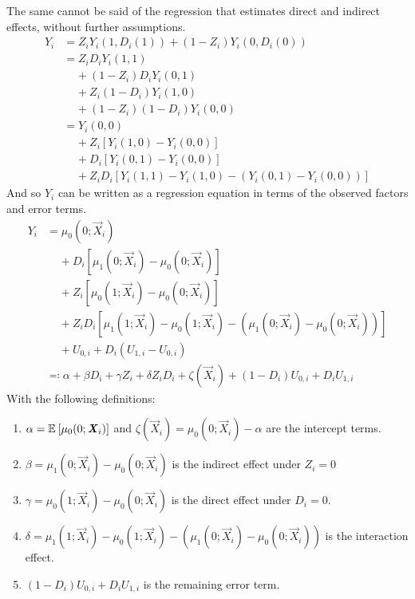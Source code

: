The same cannot be said of the regression that estimates direct and indirect effects, without further assumptions.
\begin{align*}
    Y_i &= Z_i Y_i(1, D_i(1)) + (1 - Z_i) Y_i(0, D_i(0)) \\
        &= Z_i D_i Y_i(1, 1) \\
        & \;\;\;\; + (1 - Z_i) D_i Y_i(0, 1) \\
        & \;\;\;\; + Z_i (1 - D_i) Y_i(1, 0) \\
        & \;\;\;\; + (1 - Z_i) (1 - D_i) Y_i(0, 0) \\
        &= Y_i(0, 0) \\
        & \;\;\;\; + Z_i \left[Y_i(1, 0) - Y_i(0, 0) \right] \\
        & \;\;\;\; + D_i \left[Y_i(0, 1) - Y_i(0, 0) \right] \\
        & \;\;\;\; + Z_i D_i \left[Y_i(1, 1) - Y_i(1, 0)
            - \left( Y_i(0, 1) - Y_i(0, 0) \right)\right]
\end{align*}
And so $Y_i$ can be written as a regression equation in terms of the observed factors and error terms.
\begin{align*}
    Y_i &= \mu_0(0; \vec X_i) \\
        & \;\;\;\; + D_i \left[\mu_1(0; \vec X_i) - \mu_0(0; \vec X_i) \right] \\
        & \;\;\;\; + Z_i \left[\mu_0(1; \vec X_i) - \mu_0(0; \vec X_i) \right] \\
        & \;\;\;\; + Z_i D_i \left[\mu_1(1; \vec X_i) - \mu_0(1; \vec X_i)
            - \left( \mu_1(0; \vec X_i) - \mu_0(0; \vec X_i) \right)\right] \\
        & \;\;\;\; + U_{0,i} + D_i \left( U_{1,i} - U_{0,i} \right) \\
        &\eqqcolon
            \alpha + \beta D_i + \gamma Z_i + \delta Z_i D_i
            + \zeta(\vec X_i)
            + \left( 1 - D_i \right) U_{0,i} + D_i U_{1,i}
\end{align*}
With the following definitions:
\begin{enumerate}[label=\textbf{(\alph*)}]
    \item $\alpha = \mathbb{E}_{} \left[ \mu_0(0; \boldsymbol{\mathit{X}}_i) \right]$ and $\zeta(\vec X_i) = \mu_0(0; \vec X_i) - \alpha$ are the intercept terms.
    \item $\beta = \mu_1(0; \vec X_i) - \mu_0(0; \vec X_i)$ is the indirect effect under $Z_i = 0$
    \item $\gamma = \mu_0(1; \vec X_i) - \mu_0(0; \vec X_i)$ is the direct effect under $D_i = 0$.
    \item $\delta = \mu_1(1; \vec X_i) - \mu_0(1; \vec X_i)- \left( \mu_1(0; \vec X_i) - \mu_0(0; \vec X_i) \right)$ is the interaction effect.
    \item $\left( 1 - D_i \right) U_{0,i} + D_i U_{1,i}$ is the remaining error term.
\end{enumerate}
